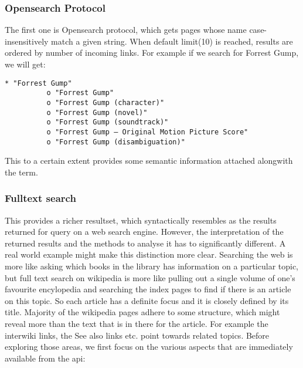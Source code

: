 \documentclass[12pt]{article}
\begin{document}
\subsubsection{Opensearch Protocol}
The first one is Opensearch protocol, which gets pages whose name case-insensitively match a given string. When default limit(10) is reached, results are ordered by number of incoming links. For example if we search for Forrest Gump, we will get:

\begin{lstlisting}[label=Opensearch Protocol, caption=Result using Opensearch]
    * "Forrest Gump"
          o "Forrest Gump"
          o "Forrest Gump (character)"
          o "Forrest Gump (novel)"
          o "Forrest Gump (soundtrack)"
          o "Forrest Gump – Original Motion Picture Score"
          o "Forrest Gump (disambiguation)"

\end{lstlisting}

This to a certain extent provides some semantic information attached alongwith the term.

\subsubsection{Fulltext search}
This provides a richer resultset, which syntactically resembles as the results returned for query on a web search engine. However, the interpretation of the returned results and the methods to analyse it has to significantly different. A real world example might make this distinction more clear. Searching the web is more like asking which books in the library has information on a particular topic, but full text search on wikipedia is more like pulling out a single volume of one's favourite encylopedia and searching the index pages to find if there is an article on this topic. So each article has a definite focus and it is closely defined by its title. Majority of the wikipedia pages adhere to some structure, which might reveal more than the text that is in there for the article. For example the interwiki links, the See also links etc. point towards related topics. Before exploring those areas, we first focus on the various aspects that are immediately available from the api:
\end{document}
